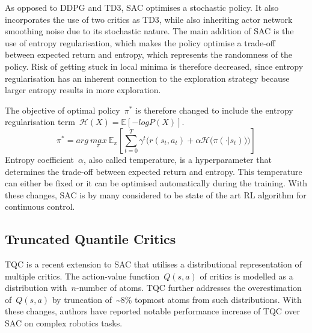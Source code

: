 As opposed to DDPG and TD3, SAC \cite{haarnoja_soft_2018} optimises a stochastic policy. It also incorporates the use of two critics as TD3, while also inheriting actor network smoothing noise due to its stochastic nature. The main addition of SAC is the use of entropy regularisation, which makes the policy optimise a trade-off between expected return and entropy, which represents the randomness of the policy. Risk of getting stuck in local minima is therefore decreased, since entropy regularisation has an inherent connection to the exploration strategy because larger entropy results in more exploration.

The objective of optimal policy~\(\pi^{*}\) is therefore changed to include the entropy regularisation term~\(\mathcal{H}(X) = \mathbb{E} [-log P(X)]\).
\begin{equation}
    \pi^{*} = arg\ \underset{\pi}{max}\ \mathbb{E}_{\pi} \left[ \sum\limits_{t=0}^T \gamma^{t} \bigg( r(s_{t}, a_{t})  + \alpha \mathcal{H}\big(\pi(\cdot \vert s_{t})\big) \bigg) \right]
\end{equation}
Entropy coefficient~\(\alpha\), also called temperature, is a hyperparameter that determines the trade-off between expected return and entropy. This temperature can either be fixed or it can be optimised automatically during the training. With these changes, SAC is by many considered to be state of the art RL algorithm for continuous control.


\subsection{Truncated Quantile Critics}

TQC \cite{kuznetsov_controlling_2020} is a recent extension to SAC that utilises a distributional representation of multiple critics. The action-value function~\(Q(s, a)\) of critics is modelled as a distribution with~\(n\)-number of atoms. TQC further addresses the overestimation of~\(Q(s, a)\) by truncation of~\textasciitilde8\% topmost atoms from such distributions. With these changes, authors have reported notable performance increase of TQC over SAC on complex robotics tasks.

